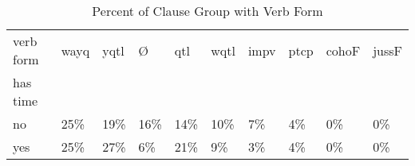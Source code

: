 \begin{table}[htbp!]
\centering
\caption{Percent of Clause Group with Verb Form}
\label{table:main_verb_pr}
\begin{tabular}{llllllllll}
\toprule
verb form & wayq & yqtl &    Ø &  qtl & wqtl & impv & ptcp & cohoF & jussF \\
has time &      &      &      &      &      &      &      &       &       \\
\midrule
no       &  25\% &  19\% &  16\% &  14\% &  10\% &   7\% &   4\% &    0\% &    0\% \\
yes      &  25\% &  27\% &   6\% &  21\% &   9\% &   3\% &   4\% &    0\% &    0\% \\
\bottomrule
\end{tabular}
\end{table}
